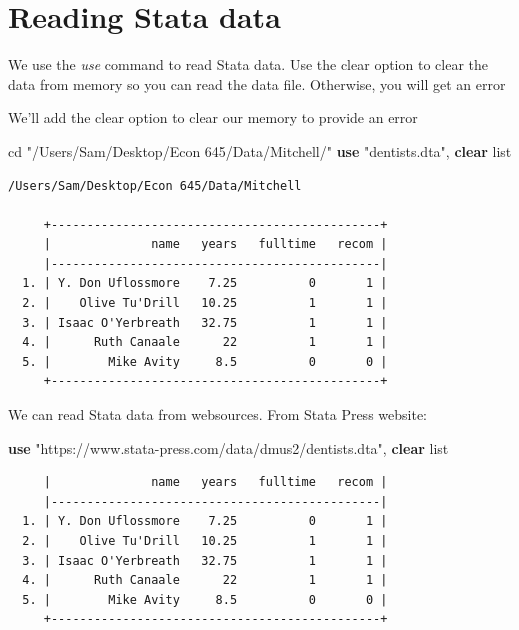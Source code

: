 \documentclass[
]{book}
\newenvironment{Shaded}{\begin{snugshade}}{\end{snugshade}}
\newcommand{\KeywordTok}[1]{\textcolor[rgb]{0.13,0.29,0.53}{\textbf{#1}}}
\newcommand{\NormalTok}[1]{#1}
\newcommand{\OtherTok}[1]{\textcolor[rgb]{0.56,0.35,0.01}{#1}}
\newcommand{\StringTok}[1]{\textcolor[rgb]{0.31,0.60,0.02}{#1}}
\begin{document}
\section{Reading Stata data}\label{reading-stata-data}

We use the \emph{use} command to read Stata data. Use the clear option to clear the data from memory so you can read the data file. Otherwise, you will get an error

We'll add the clear option to clear our memory to provide an error

\begin{Shaded}
\begin{Highlighting}[]
\NormalTok{cd }\StringTok{"/Users/Sam/Desktop/Econ 645/Data/Mitchell/"}
\KeywordTok{use} \StringTok{"dentists.dta"}\NormalTok{, }\KeywordTok{clear}
\OtherTok{list}  
\end{Highlighting}
\end{Shaded}

\begin{verbatim}
/Users/Sam/Desktop/Econ 645/Data/Mitchell

     +----------------------------------------------+
     |              name   years   fulltime   recom |
     |----------------------------------------------|
  1. | Y. Don Uflossmore    7.25          0       1 |
  2. |    Olive Tu'Drill   10.25          1       1 |
  3. | Isaac O'Yerbreath   32.75          1       1 |
  4. |      Ruth Canaale      22          1       1 |
  5. |        Mike Avity     8.5          0       0 |
     +----------------------------------------------+
\end{verbatim}

We can read Stata data from websources. From Stata Press website:

\begin{Shaded}
\begin{Highlighting}[]
\KeywordTok{use} \StringTok{"https://www.stata{-}press.com/data/dmus2/dentists.dta"}\NormalTok{, }\KeywordTok{clear}
\OtherTok{list}
\end{Highlighting}
\end{Shaded}

\begin{verbatim}
     |              name   years   fulltime   recom |
     |----------------------------------------------|
  1. | Y. Don Uflossmore    7.25          0       1 |
  2. |    Olive Tu'Drill   10.25          1       1 |
  3. | Isaac O'Yerbreath   32.75          1       1 |
  4. |      Ruth Canaale      22          1       1 |
  5. |        Mike Avity     8.5          0       0 |
     +----------------------------------------------+
\end{verbatim}
\end{document}
